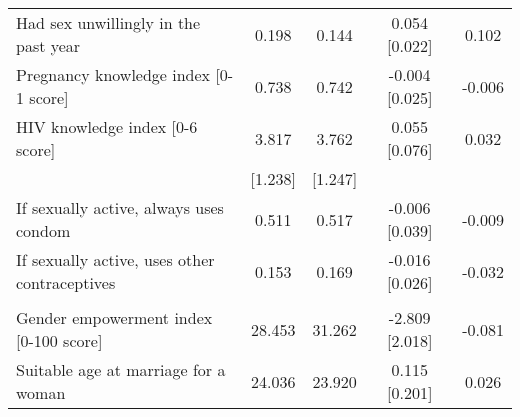 \documentclass{report}
\begin{document}
\begin{table}[H]
{\begin{tabular}{lcccc}
\hspace{1em}Had sex unwillingly in the past year & 0.198 & 0.144 & 0.054 [0.022] & 0.102\\
\hspace{1em}Pregnancy knowledge index [0-1 score] & 0.738 & 0.742 & -0.004 [0.025] & -0.006\\
\hspace{1em}HIV knowledge index [0-6 score] & 3.817 & 3.762 & 0.055 [0.076] & 0.032\\
\hspace{1em} & [1.238] & [1.247] &  & \\
\hspace{1em}If sexually active, always uses condom & 0.511 & 0.517 & -0.006 [0.039] & -0.009\\
\hspace{1em}If sexually active, uses other contraceptives & 0.153 & 0.169 & -0.016 [0.026] & -0.032\\
\addlinespace[0.3em]
\multicolumn{5}{l}{\textbf{Panel D. Beliefs and aspirations}}\\
\hspace{1em}Gender empowerment index [0-100 score] & 28.453 & 31.262 & -2.809 [2.018] & -0.081\\
\hspace{1em}Suitable age at marriage for a woman & 24.036 & 23.920 & 0.115 [0.201] & 0.026\\
\bottomrule
\end{tabular}}
\end{table}
\end{document}
